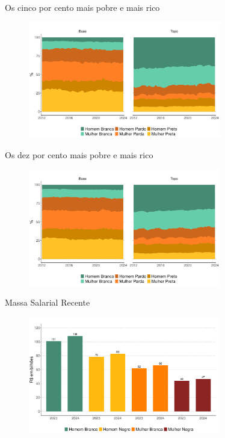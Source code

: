\documentclass[10pt, xcolor=x11names,compress]{beamer}
\begin{document}
	\begin{frame}{Os cinco por cento mais pobre e mais rico}
		\begin{figure}
			\centering
			\includegraphics[width = 0.75\textwidth]{figures_output/base_topo_5_ppb.pdf}
		\end{figure}
	\end{frame}
	
	\begin{frame}{Os dez por cento mais pobre e mais rico}
		\begin{figure}
			\centering
			\includegraphics[width = 0.75\textwidth]{figures_output/base_topo_10_ppb.pdf}
		\end{figure}
	\end{frame}
	
	\begin{frame}{Massa Salarial Recente}
		\begin{figure}
			\centering
			\includegraphics[width = 0.75\textwidth]{figures_output/massa_habitual.pdf}
		\end{figure}
	\end{frame}
	
\end{document}
